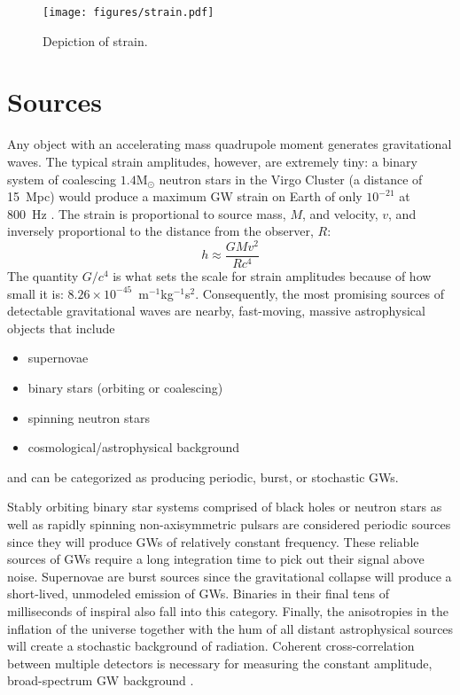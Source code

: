 \begin{figure}
\begin{centering}
\texttt{[image: figures/strain.pdf]}
\caption[Depiction of strain]{Depiction of strain.}
\label{fig:strain}
\end{centering}
\end{figure}



\section{Sources}
Any object with an accelerating mass quadrupole moment generates
gravitational waves. The typical strain amplitudes, however, are
extremely tiny: a binary system of coalescing $1.4 \mbox{M}_\odot$
neutron stars in the Virgo Cluster (a distance of 15~Mpc) would
produce a maximum GW strain on Earth of only $10^{-21}$ at 800~Hz
\cite{Saulson1994Fundamentals}. The strain is proportional to source
mass, $M$, and velocity, $v$, and inversely proportional to the
distance from the observer, $R$:
\begin{equation}
h \approx \frac{GMv^2}{Rc^4}
\end{equation}
The quantity $G/c^4$ is what sets the scale for strain amplitudes
because of how small it is: $8.26 \times
10^{-45}$~m$^{-1}$kg$^{-1}$s$^2$. Consequently, the most promising
sources of detectable gravitational waves are nearby, fast-moving,
massive astrophysical objects that include
\begin{itemize}
\item supernovae \cite{Abbott2009Search} \vspace{-10pt}
\item binary stars (orbiting or coalescing) \cite{S5CBCnospin} \vspace{-10pt}
\item spinning neutron stars \cite{Abadie2010First} \vspace{-10pt}
\item cosmological/astrophysical background \cite{Allen1999Detecting}
\end{itemize}
and can be categorized as producing periodic, burst, or stochastic
GWs. 

Stably orbiting binary star systems comprised of black holes or
neutron stars as well as rapidly spinning non-axisymmetric pulsars are
considered periodic sources since they will produce GWs of relatively
constant frequency. These reliable sources of GWs require a long
integration time to pick out their signal above noise. 
Supernovae are burst sources since the gravitational
collapse will produce a short-lived, unmodeled emission of
GWs. Binaries in their final tens of milliseconds of inspiral also
fall into this category. Finally, the anisotropies in the inflation of
the universe together with the hum of all distant astrophysical
sources will create a stochastic background of radiation. Coherent
cross-correlation between multiple detectors is necessary for
measuring the constant amplitude, broad-spectrum GW
background \cite{Maggiore2000Gravitational}.

